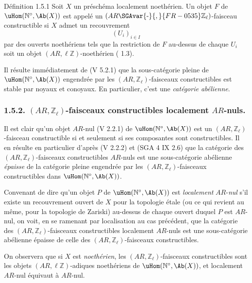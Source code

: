 \begin{statement}{Définition 1.5.1}
Soit \(X\) un préschéma localement noethérien. Un objet \(F\) de \(\uHom(\mathbb{N}^\circ,\Ab(X))\) est appelé un \((AR\SGAvar{\text{-}}{,}{FR-0535}\mathbb{Z}_\ell)\)-faisceau constructible si \(X\) admet un recouvrement
\[
(U_i)_{i\in I}
\]
par des
ouverts noethériens tels que la restriction de \(F\) au-dessus de chaque \(U_i\) soit un objet \((AR,\ell\mathbb{Z})\)-noethérien ( 1.3).
\end{statement}

Il résulte immédiatement de (V 5.2.1) que la sous-catégorie pleine de \(\uHom(\mathbb{N}^\circ,\Ab(X))\) engendrée par les \((AR,\mathbb{Z}_\ell)\)-faisceaux constructibles est stable par noyaux et conoyaux. En particulier, c'est une \emph{catégorie abélienne}.

\subsubsection*{1.5.2. \((AR,\mathbb{Z}_\ell)\)-faisceaux constructibles localement \(AR\)-nuls.}

Il est clair qu'un objet \(AR\)-nul (V 2.2.1) de \(\uHom(\mathbb{N}^\circ,\Ab(X))\) est un \((AR,\mathbb{Z}_\ell)\)-faisceau constructible si et seulement si ses composantes sont constructibles. Il en résulte en particulier d'après (V 2.2.2) et (SGA 4 IX 2.6) que la catégorie des \((AR,\mathbb{Z}_\ell)\)-faisceaux constructibles \(AR\)-nuls est une sous-catégorie abélienne \emph{épaisse} de la catégorie pleine engendrée par les \((AR,\mathbb{Z}_\ell)\)-faisceaux constructibles dans \(\uHom(\mathbb{N}^\circ,\Ab(X))\).

Convenant de dire qu'un objet \(P\) de \(\uHom(\mathbb{N}^\circ,\Ab(X))\) est \emph{localement} \(AR\)-\emph{nul} s'il existe un recouvrement ouvert de \(X\) pour la topologie étale (ou ce qui revient au même, pour la topologie de Zariski) au-dessus de chaque ouvert duquel \(P\) est \(AR\)-nul, on voit, en se ramenant par localisation au cas précédent, que la catégorie des \((AR,\mathbb{Z}_\ell)\)-faisceaux constructibles localement \(AR\)-nuls est une sous-catégorie abélienne épaisse de celle des \((AR,\mathbb{Z}_\ell)\)-faisceaux constructibles.

On observera que si \(X\) est \emph{noethérien}, les \((AR,\mathbb{Z}_\ell)\)-faisceaux constructibles sont les objets \((AR,\ell\mathbb{Z})\)-adiques noethériens de \(\uHom(\mathbb{N}^\circ,\Ab(X))\), et localement \(AR\)-nul équivaut à \(AR\)-nul.

